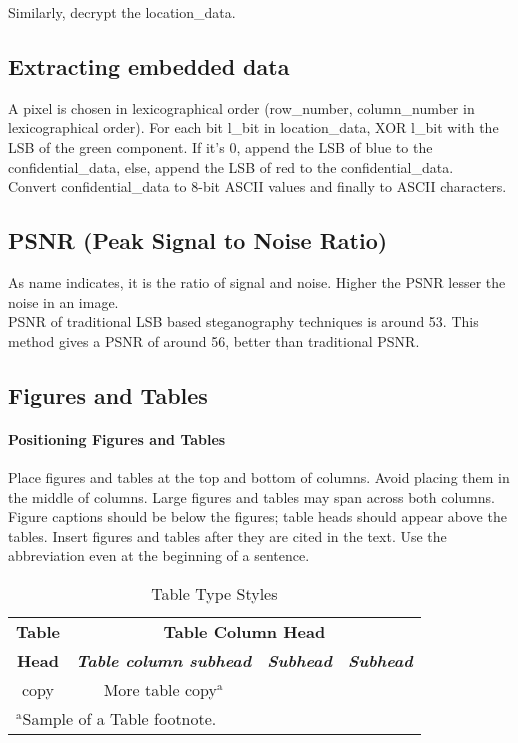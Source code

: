 \documentclass[conference]{IEEEtran}
\begin{document}
Similarly, decrypt the location\_data. \\
\subsection{Extracting embedded data}
A pixel is chosen in lexicographical order (row\_number, column\_number in lexicographical order).
For each bit l\_bit in location\_data, XOR l\_bit with the LSB of the green component.
If it's 0, append the LSB of blue to the confidential\_data, else, append the LSB of red to the confidential\_data.\\

Convert confidential\_data to 8-bit ASCII values and finally to ASCII characters.\\
\subsection{PSNR (Peak Signal to Noise Ratio)}
As name indicates, it is the ratio of signal and noise.
Higher the PSNR lesser the noise in an image.\\

PSNR of traditional LSB based steganography techniques is around 53.
This method gives a PSNR of around 56, better than traditional PSNR.\\  
\subsection{Figures and Tables}
\paragraph{Positioning Figures and Tables} Place figures and tables at the top and 
bottom of columns. Avoid placing them in the middle of columns. Large 
figures and tables may span across both columns. Figure captions should be 
below the figures; table heads should appear above the tables. Insert 
figures and tables after they are cited in the text. Use the abbreviation 
even at the beginning of a sentence.

\begin{table}[htbp]
\caption{Table Type Styles}
\begin{center}
\begin{tabular}{|c|c|c|c|}
\hline
\textbf{Table}&\multicolumn{3}{|c|}{\textbf{Table Column Head}} \\
\cline{2-4} 
\textbf{Head} & \textbf{\textit{Table column subhead}}& \textbf{\textit{Subhead}}& \textbf{\textit{Subhead}} \\
\hline
copy& More table copy$^{\mathrm{a}}$& &  \\
\hline
\multicolumn{4}{l}{$^{\mathrm{a}}$Sample of a Table footnote.}
\end{tabular}
\label{tab1}
\end{center}
\end{table}
\end{document}
